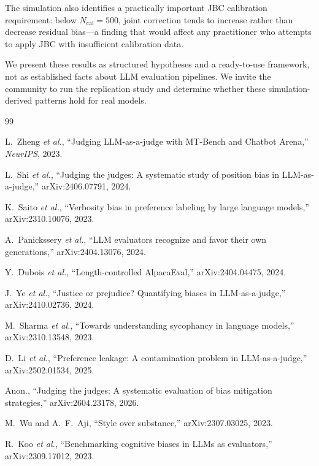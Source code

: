 \documentclass[10pt,conference]{IEEEtran}
\begin{document}
The simulation also identifies a practically important
JBC calibration requirement: below $N_\text{cal}{=}500$,
joint correction tends to increase rather than decrease
residual bias---a finding that would affect any practitioner
who attempts to apply JBC with insufficient calibration data.

We present these results as structured hypotheses and
a ready-to-use framework, not as established facts
about LLM evaluation pipelines.
We invite the community to run the replication study
and determine whether these simulation-derived patterns
hold for real models.

\balance

\begin{thebibliography}{99}

L.~Zheng \textit{et al.}, ``Judging LLM-as-a-judge with MT-Bench
and Chatbot Arena,'' \emph{NeurIPS}, 2023.

L.~Shi \textit{et al.}, ``Judging the judges: A systematic study
of position bias in LLM-as-a-judge,'' arXiv:2406.07791, 2024.

K.~Saito \textit{et al.}, ``Verbosity bias in preference labeling
by large language models,'' arXiv:2310.10076, 2023.

A.~Panickssery \textit{et al.}, ``LLM evaluators recognize and
favor their own generations,'' arXiv:2404.13076, 2024.

Y.~Dubois \textit{et al.}, ``Length-controlled AlpacaEval,''
arXiv:2404.04475, 2024.

J.~Ye \textit{et al.}, ``Justice or prejudice? Quantifying biases
in LLM-as-a-judge,'' arXiv:2410.02736, 2024.

M.~Sharma \textit{et al.}, ``Towards understanding sycophancy in
language models,'' arXiv:2310.13548, 2023.

D.~Li \textit{et al.}, ``Preference leakage: A contamination
problem in LLM-as-a-judge,'' arXiv:2502.01534, 2025.

Anon., ``Judging the judges: A systematic evaluation of bias
mitigation strategies,'' arXiv:2604.23178, 2026.

M.~Wu and A.~F.~Aji, ``Style over substance,''
arXiv:2307.03025, 2023.

R.~Koo \textit{et al.}, ``Benchmarking cognitive biases in LLMs
as evaluators,'' arXiv:2309.17012, 2023.


\end{thebibliography}
\end{document}

